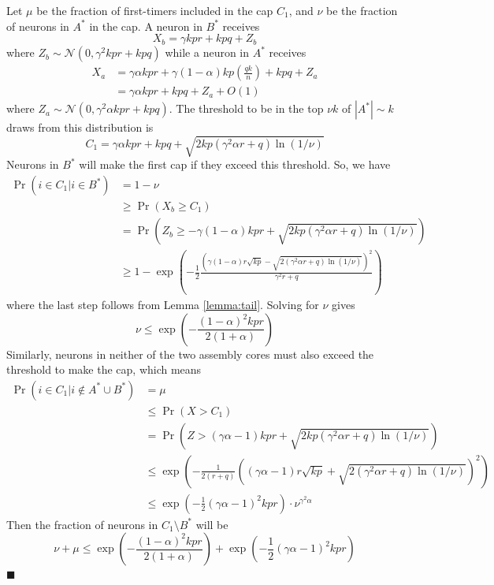 \documentclass[final,12pt]{colt2022} %
\newcommand{\assmcore}[1]{{#1}^*}
\begin{document}
Let $\mu$ be the fraction of first-timers included in the cap $C_1$, and $\nu$ be the fraction of neurons in $\assmcore{A}$ in the cap. A neuron in $\assmcore{B}$ receives \[X_b = \gamma kpr + kpq + Z_b\] where $Z_b \sim \mathcal N(0, \gamma^2 kpr + kpq)$ while a neuron in $\assmcore{A}$ receives \begin{align*}
    X_a &= \gamma \alpha kpr + \gamma (1-\alpha) kp\left(\frac{qk}{n}\right) + kpq + Z_a\\ 
    &= \gamma \alpha kpr + kpq + Z_a + O(1)
\end{align*} where $Z_a \sim \mathcal N(0, \gamma^2 \alpha kpr + kpq)$. The threshold to be in the top $\nu k$ of $|\assmcore{A}| \sim k$ draws from this distribution is \[C_1 = \gamma \alpha kpr + kpq + \sqrt{2kp(\gamma^2\alpha r+ q)\ln(1/\nu)}\] Neurons in $\assmcore{B}$ will make the first cap if they exceed this threshold. So, we have \begin{align*}
    \Pr (i \in C_1 | i \in \assmcore{B}) &= 1 - \nu\\
    &\geq \Pr (X_b \geq C_1)\\
    &= \Pr \left(Z_b \geq -\gamma(1- \alpha) kpr + \sqrt{2kp(\gamma^2\alpha r+ q)\ln(1/\nu)} \right)\\
    &\ge 1 - \exp\left(-\frac{1}{2}\frac{\left(\gamma(1- \alpha) r\sqrt{kp} - \sqrt{2(\gamma^2\alpha r+ q)\ln(1/\nu)}\right)^2}{\gamma^2r + q}\right)
\end{align*}
where the last step follows from Lemma \ref{lemma:tail}. Solving for $\nu$ gives \[\nu \leq \exp\left(-\frac{(1- \alpha)^2 kpr}{2(1+\alpha)}\right) \]
Similarly, neurons in neither of the two assembly cores must also exceed the threshold to make the cap, which means \begin{align*}
    \Pr (i \in C_1 | i \not\in \assmcore{A} \cup \assmcore{B}) &= \mu\\
    &\leq \Pr (X > C_1)\\
    &= \Pr \left(Z > (\gamma \alpha - 1) kpr + \sqrt{2kp(\gamma^2\alpha r+ q)\ln(1/\nu)}\right)\\
    &\leq \exp\left(-\frac{1}{2(r+q)}\left((\gamma \alpha - 1) r\sqrt{kp} + \sqrt{2(\gamma^2\alpha r+ q)\ln(1/\nu)} \right)^2\right)\\
    &\le \exp\left(-\frac{1}{2}(\gamma \alpha - 1)^2 kpr \right) \cdot \nu^{\gamma^2 \alpha}
\end{align*}
Then the fraction of neurons in $C_1 \setminus \assmcore{B}$ will be 
\[\nu + \mu \leq \exp\left(-\frac{(1- \alpha)^2 kpr}{2(1+\alpha)}\right) + \exp\left(-\frac{1}{2}(\gamma \alpha - 1)^2 kpr \right) \] \hfill$\blacksquare$
\end{document}
